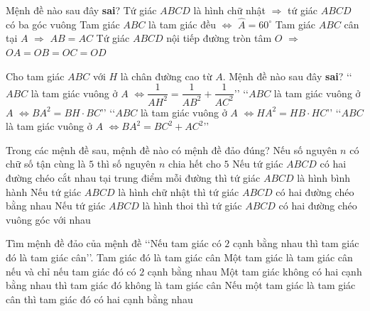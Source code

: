 \begin{ex}%
	Mệnh  đề nào sau đây {\bf sai}?
	\choice 
		{Tứ giác  $ABCD$ là hình chữ nhật $\Rightarrow$ tứ giác $ABCD$ có ba góc vuông}
		{\True Tam giác $ABC$ là  tam giác đều $\Leftrightarrow$ $\widehat{A}=60^\circ$}
		{Tam  giác $ABC$ cân tại $A$ $\Rightarrow$ $AB=AC$}
		{Tứ giác  $ABCD$ nội tiếp đường tròn tâm $O$ $\Rightarrow$ $OA=OB=OC=OD$}
\end{ex}

\begin{ex}%
	Cho tam giác $ABC$ với $H$ là chân đường cao từ $A$. Mệnh đề nào sau  đây {\bf sai}?
	\choice 
		{\lq\lq $ABC$ là tam giác vuông ở $A$ $\Leftrightarrow \dfrac{1}{AH^2}=\dfrac{1}{AB^2}+\dfrac{1}{AC^2}$\rq\rq} 
		{\lq\lq  $ABC$ là tam giác vuông ở $A$ $\Leftrightarrow BA^2=BH\cdot BC$\rq\rq}
		{\lq\lq  $ABC$ là tam giác vuông ở $A$ $\Leftrightarrow HA^2=HB\cdot HC$\rq\rq}
		{\True \lq\lq $ABC$ là tam giác vuông ở $A$ $\Leftrightarrow BA^2=BC^2+AC^2$\rq\rq} 
\end{ex}

\begin{ex}%
	Trong các mệnh đề sau, mệnh đề  nào có mệnh đề đảo đúng?
	\choice 
		{Nếu số nguyên $n$ có chữ số tận  cùng là $5$ thì số nguyên $n$ chia hết cho $5$}
		{\True Nếu tứ giác $ABCD$ có hai đường chéo cắt  nhau tại trung điểm mỗi đường thì tứ giác $ABCD$ là hình bình hành}
		{Nếu tứ giác $ABCD$ là hình chữ nhật thì tứ giác $ABCD$ có  hai đường chéo bằng nhau}
		{Nếu tứ giác $ABCD$ là hình thoi thì tứ giác $ABCD$ có hai đường chéo  vuông góc với nhau}
\end{ex}

\begin{ex}%
	Tìm mệnh đề đảo  của mệnh đề \lq\lq Nếu tam giác có $2$ cạnh bằng nhau thì tam giác đó là tam giác cân\rq\rq .
	\choice 
		{Tam giác  đó là tam giác cân}
		{Một tam giác là tam giác cân nếu và chỉ nếu tam giác đó có $2$ cạnh bằng nhau} 
		{Một tam giác không có hai cạnh bằng nhau thì tam giác  đó không là tam giác cân}
		{\True Nếu một tam giác là tam giác cân thì tam giác đó  có hai cạnh bằng nhau}
\end{ex}

